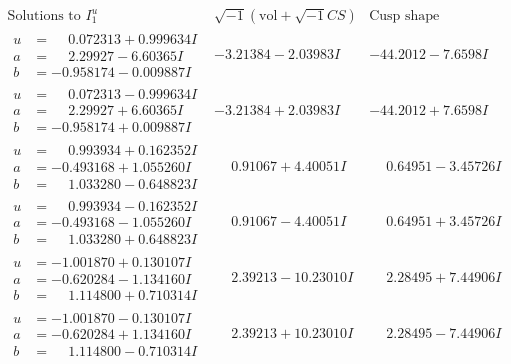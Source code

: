 \documentclass[1p]{elsarticle_modified}
\theoremstyle{definition}
\newcommand{\I}{\sqrt{-1}}
\begin{document}
$$\begin{array}{c|c|c}  
\text{Solutions to }I^u_{1}& \I (\text{vol} + \sqrt{-1}CS) & \text{Cusp shape}\\
 \hline 
\begin{aligned}
u &= \phantom{-}0.072313 + 0.999634 I \\
a &= \phantom{-}2.29927 - 6.60365 I \\
b &= -0.958174 - 0.009887 I\end{aligned}
 & -3.21384 - 2.03983 I & -44.2012 - 7.6598 I \\ \hline\begin{aligned}
u &= \phantom{-}0.072313 - 0.999634 I \\
a &= \phantom{-}2.29927 + 6.60365 I \\
b &= -0.958174 + 0.009887 I\end{aligned}
 & -3.21384 + 2.03983 I & -44.2012 + 7.6598 I \\ \hline\begin{aligned}
u &= \phantom{-}0.993934 + 0.162352 I \\
a &= -0.493168 + 1.055260 I \\
b &= \phantom{-}1.033280 - 0.648823 I\end{aligned}
 & \phantom{-}0.91067 + 4.40051 I & \phantom{-}0.64951 - 3.45726 I \\ \hline\begin{aligned}
u &= \phantom{-}0.993934 - 0.162352 I \\
a &= -0.493168 - 1.055260 I \\
b &= \phantom{-}1.033280 + 0.648823 I\end{aligned}
 & \phantom{-}0.91067 - 4.40051 I & \phantom{-}0.64951 + 3.45726 I \\ \hline\begin{aligned}
u &= -1.001870 + 0.130107 I \\
a &= -0.620284 - 1.134160 I \\
b &= \phantom{-}1.114800 + 0.710314 I\end{aligned}
 & \phantom{-}2.39213 - 10.23010 I & \phantom{-}2.28495 + 7.44906 I \\ \hline\begin{aligned}
u &= -1.001870 - 0.130107 I \\
a &= -0.620284 + 1.134160 I \\
b &= \phantom{-}1.114800 - 0.710314 I\end{aligned}
 & \phantom{-}2.39213 + 10.23010 I & \phantom{-}2.28495 - 7.44906 I \\ \hline\begin{aligned}

\end{aligned}
\end{array}$$
\end{document}
